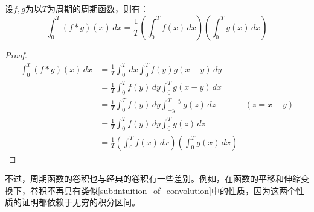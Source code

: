 \documentclass{ctexbook}
\begin{document}
\begin{proposition}[“面积”关系]
    设$f,g$为以$T$为周期的周期函数，则有：
    \[\int_0^{T}(f*g)(x)\,dx=\frac{1}{T}\left(\int_0^{T}f(x)\,dx\right)\left(\int_0^{T}g(x)\,dx\right)\]
\end{proposition}
\begin{proof}
    \begin{align*}
        \int_0^{T}(f*g)(x)\,dx&=\frac{1}{T}\int_0^{T}\,dx\int_0^{T}f(y)g(x-y)\,dy\\
        &=\frac{1}{T}\int_0^{T}f(y)\,dy\int_0^{T}g(x-y)\,dx\\
        &=\frac{1}{T}\int_0^{T}f(y)\,dy\int_{-y}^{T-y}g(z)\,dz&(z=x-y)\\
        &=\frac{1}{T}\int_0^{T}f(y)\,dy\int_0^{T}g(z)\,dz\\
        &=\frac{1}{T}\left(\int_0^{T}f(x)\,dx\right)\left(\int_0^{T}g(x)\,dx\right)
    \end{align*}
\end{proof}

不过，周期函数的卷积也与经典的卷积有一些差别。例如，在函数的平移和伸缩变换下，卷积不再具有类似\ref{sub:intuition_of_convolution}中的性质，因为这两个性质的证明都依赖于无穷的积分区间。
\end{document}
